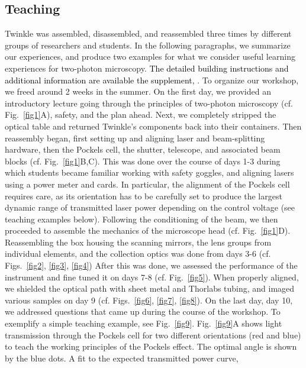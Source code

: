 \documentclass[10pt,letterpaper]{article}
\begin{document}
\subsection*{Teaching}
Twinkle was assembled, disassembled, and reassembled three times by different groups of researchers and students. In the following paragraphs, we summarize our experiences, and produce two examples for what we consider useful learning experiences for two-photon microscopy. \textcolor{black}{The detailed building instructions and additional information are available the supplement, }.\newline
To organize our workshop, we freed around 2 weeks in the summer. On the first day, we provided an introductory lecture going through the principles of two-photon microscopy (cf. Fig.~\ref{fig1}A), safety, and the plan ahead. Next, we completely stripped the optical table and returned Twinkle's components back into their containers. Then reassembly began, first setting up and aligning laser and beam-splitting hardware, then the Pockels cell, the shutter, telescope, and associated beam blocks (cf. Fig.~\ref{fig1}B,C). This was done over the course of days 1-3 during which students became familiar working with safety goggles, and aligning lasers using a power meter and cards. In particular, the alignment of the Pockels cell requires care, as its orientation has to be carefully set to produce the largest dynamic range of transmitted laser power depending on the control voltage (see teaching examples below). Following the conditioning of the beam, we then proceeded to assemble the mechanics of the microscope head (cf. Fig.~\ref{fig1}D). Reassembling the box housing the scanning mirrors, the lens groups from individual elements, and the collection optics was done from days 3-6 (cf. Figs.~\ref{fig2}, \ref{fig3}, \ref{fig4}) After this was done, we assessed the performance of the instrument and fine tuned it on days 7-8 (cf. Fig.~\ref{fig5}). When properly aligned, we shielded the optical path with sheet metal and Thorlabs tubing, and imaged various samples on day 9 (cf. Figs.~\ref{fig6}, \ref{fig7}, \ref{fig8}). On the last day, day 10, we addressed questions that came up during the course of the workshop.\newline
To exemplify a simple teaching example, see Fig.~\ref{fig9}. Fig.~\ref{fig9}A shows light transmission through the Pockels cell for two different orientations (red and blue) to teach the working principles of the Pockels effect. The optimal angle is shown by the blue dots. A fit to the expected transmitted power curve, 
\end{document}
